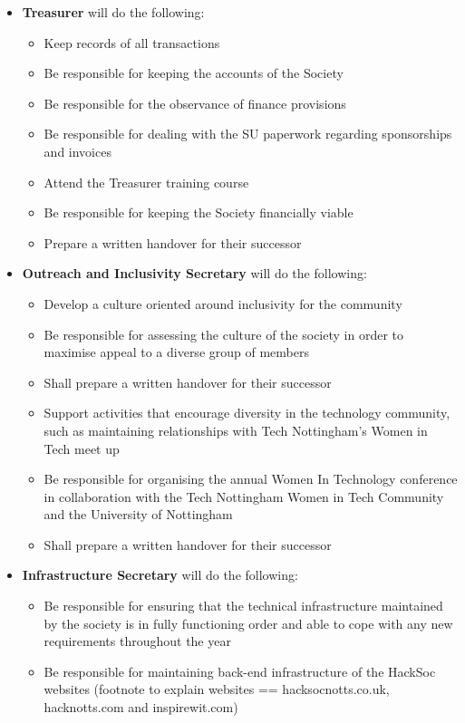 \documentclass[a4paper,twoside,notitlepage,11pt]{article}
\begin{document}
\begin{itemize}
\begin{itemize}
	\end{itemize}
	\item \textbf{Treasurer} will do the following:
	\begin{itemize}
	  \item Keep records of all transactions
	  \item Be responsible for keeping the accounts of the Society
	  \item Be responsible for the observance of finance provisions
	  \item Be responsible for dealing with the SU paperwork regarding sponsorships and invoices
	  \item Attend the Treasurer training course
	  \item Be responsible for keeping the Society financially viable
	  \item Prepare a written handover for their successor
	\end{itemize}
	\item \textbf{Outreach and Inclusivity Secretary} will do the following:
	\begin{itemize} 
	  \item Develop a culture oriented around inclusivity for the community
	  \item Be responsible for assessing the culture of the society in order to maximise appeal to a diverse group of members
	  \item Shall prepare a written handover for their successor
	  \item Support activities that encourage diversity in the technology community, such as maintaining relationships with Tech Nottingham’s Women in Tech meet up
	  \item Be responsible for organising the annual Women In Technology conference in collaboration with the Tech Nottingham Women in Tech Community and the University of Nottingham
	  \item Shall prepare a written handover for their successor
	\end{itemize}
	\item \textbf{Infrastructure Secretary} will do the following: 
	\begin{itemize}
	  \item Be responsible for ensuring that the technical infrastructure maintained by the society is in fully functioning order and able to cope with any new requirements throughout the year
	  \item Be responsible for maintaining back-end infrastructure of the HackSoc websites (footnote to explain websites == hacksocnotts.co.uk, hacknotts.com and inspirewit.com)

\end{itemize}
\end{itemize}
\end{document}
